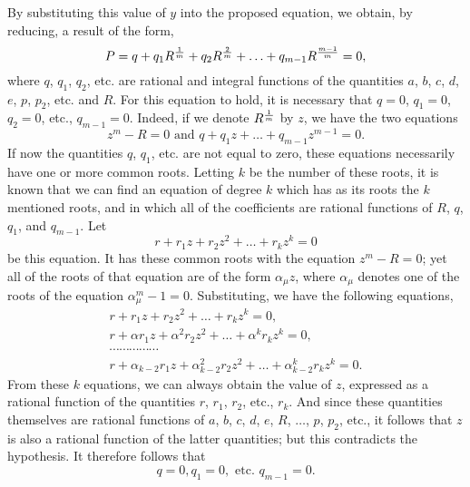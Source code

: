 \documentclass[oneside, 12 pt, leqno]{memoir}
\let\oldfrac\frac
\def\frac#1#2{\mathchoice{\text{\scalebox{.83}{${\oldfrac{#1}{#2}}$}}}{\text{\scalebox{.83}{${\displaystyle\oldfrac{#1}{#2}}$}}}{\genfrac{}{}{}{2}{#1}{#2}}{\genfrac{}{}{}{3}{#1}{#2}}}
\begin{document}
By substituting this value of \(y\) into the proposed equation, we obtain, by reducing, a result of the form,
\[P=q+q_1 R^{\frac{1}{m}}+q_2 R^{\frac{2}{m}}+\ldots+q_{m-1} R^{\frac{m-1}{m}}=0,\]
where \(q\), \(q_1\), \(q_2\), etc. are rational and integral functions of the quantities \(a\), \(b\), \(c\), \(d\), \(e\), \(p\), \(p_2\), etc. and \(R\). For this equation to hold, it is necessary that \(q=0\), \(q_1=0\), \(q_2=0\), etc., \(q_{m-1}=0\). Indeed, if we denote \(R^{\frac{1}{m}}\) by \(z\), we have the two equations
\[z^m-R=0 \text{ and } q+q_1 z+\ldots+q_{m-1} z^{m-1}=0.\]
If now the quantities \(q\), \(q_1\), etc. are not equal to zero, these equations necessarily have one or more common roots. Letting \(k\) be the number of these roots, it is known that we can find an equation of degree \(k\) which has as its roots the \(k\) mentioned roots, and in which all of the coefficients are rational functions of \(R\), \(q\), \(q_1\), and \(q_{m-1}\). Let
\[r+r_1 z+r_2 z^2+\ldots+r_k z^k=0\]
be this equation. It has these common roots with the equation \(z^m-R=0\); yet all of the roots of that equation are of the form \(\alpha_\mu z\), where \(\alpha_\mu\) denotes one of the roots of the equation \(\alpha_\mu^m-1=0\).  Substituting, we have the following equations,
\[\begin{gathered}
r+r_1 z+r_2 z^2+\ldots+r_k z^k=0,\\
r+\alpha r_1 z+\alpha^2 r_2 z^2+\ldots+\alpha^k r_k z^k=0,\\
\cdots \cdots \cdots \cdots \cdots \\
r+\alpha_{k-2} r_1 z+\alpha_{k-2}^2 r_2 z^2+\ldots+\alpha_{k-2}^k r_k z^k=0.
\end{gathered}\]
From these \(k\) equations, we can always obtain the value of \(z\), expressed as a rational function of the quantities \(r\), \(r_1\), \(r_2\), etc., \(r_k\). And since these quantities themselves are rational functions of \(a\), \(b\), \(c\), \(d\), \(e\), \(R\), \(\dots\), \(p\), \(p_2\), etc., it follows that \(z\) is also a rational function of the latter quantities; but this contradicts the hypothesis. It therefore follows that
\[q=0, q_1=0, \text{ etc. } q_{m-1}=0.\]
\end{document}
